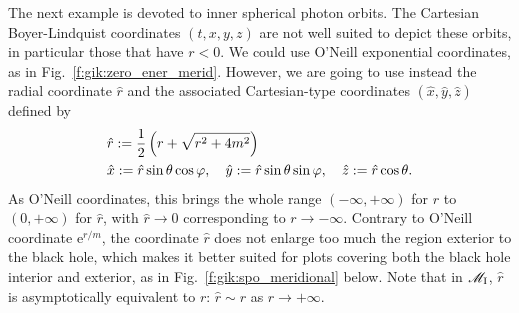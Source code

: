 The next example is devoted to inner spherical photon orbits. The
Cartesian Boyer-Lindquist coordinates $(t,x,y,z)$ are not well suited to
depict these orbits, in particular those that have $r<0$. We could
use O'Neill exponential coordinates, as in Fig.~\ref{f:gik:zero_ener_merid}.
However, we are going to use instead the radial coordinate $\hat{r}$ and the
associated Cartesian-type coordinates $(\hat{x}, \hat{y}, \hat{z})$ defined
by
\begin{subequations}
\label{e:gik:def_hat_coord}
\begin{align}
    & \hat{r} := \frac{1}{2} \left( r + \sqrt{r^2 + 4m^2} \right)  \\
    & \hat{x} := \hat{r}\sin\theta\cos\varphi,\quad
      \hat{y} := \hat{r}\sin\theta\sin\varphi,\quad
      \hat{z} := \hat{r}\cos\theta .
\end{align}
\end{subequations}
As O'Neill coordinates, this brings the whole range
$(-\infty,+\infty)$ for $r$
to $(0,+\infty)$ for $\hat{r}$, with $\hat{r}\to 0$ corresponding to $r\to -\infty$.
Contrary to O'Neill coordinate $\mathrm{e}^{r/m}$, the
coordinate $\hat{r}$ does not enlarge too much the region exterior
to the black hole, which makes it better suited for plots covering both
the black hole interior and exterior, as in Fig.~\ref{f:gik:spo_meridional} below.
Note that in $\mathscr{M}_{\rm I}$, $\hat{r}$ is asymptotically equivalent to $r$:
$\hat{r} \sim r $ as $r\to + \infty$.

